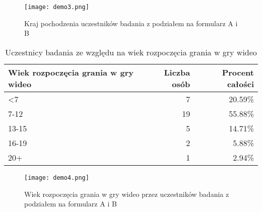 \begin{figure}[h!]
    \centering
    \texttt{[image: demo3.png]}
    \caption{Kraj pochodzenia uczestników badania z podziałem na formularz A i B}
    \label{fig:ch7_demo3}
\end{figure}

\begin{table}[h!]
    \begin{center}
        \begin{tabular}{|l|r|r|}
            \hline
            Wiek rozpoczęcia grania w gry wideo & Liczba osób & Procent całości \\
            \hline
            <7                                  & 7           & 20.59\%         \\
            7-12                                & 19          & 55.88\%         \\
            13-15                               & 5           & 14.71\%         \\
            16-19                               & 2           & 5.88\%          \\
            20+                                 & 1           & 2.94\%          \\
            \hline
        \end{tabular}
    \end{center}
    \caption{Uczestnicy badania ze względu na wiek rozpoczęcia grania w gry wideo}\label{tab1:ch7_4}
\end{table}

\begin{figure}[h!]
    \centering
    \texttt{[image: demo4.png]}
    \caption{Wiek rozpoczęcia grania w gry wideo przez uczestników badania z podziałem na formularz A i B}
    \label{fig:ch7_demo4}
\end{figure}

